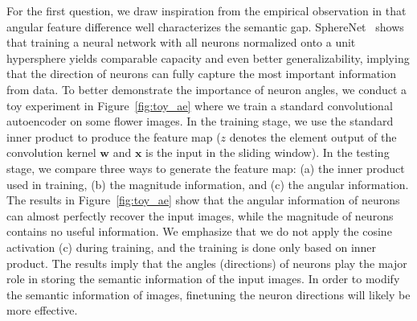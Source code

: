 \begin{itemize}[leftmargin=*,nosep]
For the first question, we draw inspiration from the empirical observation in \cite{liu2018decoupled,chen2020angular} that angular feature difference well characterizes the semantic gap. SphereNet~\cite{liu2017deep} shows that training a neural network with all neurons normalized onto a unit hypersphere yields comparable capacity and even better generalizability, implying that the direction of neurons can fully capture the most important information from data. To better demonstrate the importance of neuron angles, we conduct a toy experiment in Figure~\ref{fig:toy_ae} where we train a standard convolutional autoencoder on some flower images. In the training stage, we use the standard inner product to produce the feature map ($z$ denotes the element output of the convolution kernel $\bm{w}$ and $\bm{x}$ is the input in the sliding window). In the testing stage, we compare three ways to generate the feature map: (a) the inner product used in training, (b) the magnitude information, and (c) the angular information. The results in Figure~\ref{fig:toy_ae} show that the angular information of neurons can almost perfectly recover the input images, while the magnitude of neurons contains no useful information. We emphasize that we do not apply the cosine activation (c) during training, and the training is done only based on inner product. The results imply that the angles (directions) of neurons play the major role in storing the semantic information of the input images. In order to modify the semantic information of images, finetuning the neuron directions will likely be more effective.


\end{itemize}
